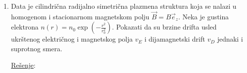\documentclass[fleqn]{report}
\begin{document}
\begin{enumerate}
          Jedini drift koji je prisutan je $E \times B$ drift, gde je brzina drifta data sa:
          \[ \vec v = \frac{\vec E \times \vec B}{B^2} \]
          Vektor $\vec B$ je već poznat, pa je potrebno samo odrediti izraz za vektor električnog polja $\vec E$.
          Pošto je raspodela naelektrisanja data, to možemo naći pomoću Gausovog zakona (posmatramo cilindričnu površ unutar snopa visine $\Delta z$ i poluprečnika $r$):
          \begin{align*}
               & \int_S \vec{E}\cdot d\vec{S} = \frac{1}{\varepsilon_0} \int_V \rho dV                                                          \\
               & E \cdot 2 \cancel{\pi} \cancel r \cancel{\Delta z} = -\frac{e n_e r^{\cancel 2} \cancel{\pi} \cancel{\Delta z}}{\varepsilon_0} \\
               & E = - \frac{en_e}{2\varepsilon_e}r                                                                                             \\
               & \vec{E} = -\frac{e n_e}{2\varepsilon_0} r \vec{e}_r
          \end{align*}
          Sada možemo odrediti i brzinu drifta:
          \[ \vec{v} = \frac{\vec{E}\times\vec{B}}{B^2} = \frac{|\vec{E}|}{B_0} \underbrace{(\vec{e}_r \times \vec{e}_z)}_{-\vec{e}_\phi} = \frac{e n_e r}{2\varepsilon_0 B_0} \vec{e}_\phi \]
          Maksimalna vrednost brzine se dostiže na ivicama snopa:
          \[ v_{max} = v(r = a) = \frac{e n_e a}{2 \varepsilon_0 B_0} = 4517\si{\kilo\meter\per\second} \]
          Možemo da uočimo da elektroni u snopu driftuju \enquote{spiralno}, pa se radi o takozvanom Brillouin-ovom driftu.

          \hrulefill
    \item Data je cilindrična radijalno simetrična plazmena struktura koja se nalazi u homogenom i stacionarnom magnetskom polju $\vec{B} = B \vec{e}_z$.
          Neka je gustina elektrona $n(r) = n_0 \exp\left(-\frac{r^2}{r_0^2}\right)$.
          Pokazati da su brzine drifta usled ukrštenog električnog i magnetskog polja $v_E$ i dijamagnetski drift $v_D$ jednaki i suprotnog smera.

          \underline{Rešenje}:


\end{enumerate}
\end{document}

